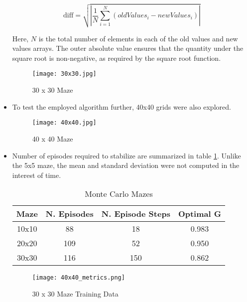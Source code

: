 \documentclass[letterpaper]{article} %
\begin{document}
\begin{itemize}
	    \begin{equation}
		\text{diff} = \sqrt{\left| \frac{1}{N} \sum_{i=1}^{N} (oldValues_i - newValues_i) \right| }
		\label{eq:value_fn_compare}
	    \end{equation}

	    Here, \( N \) is the total number of elements in each of the old values and new values arrays. The outer absolute value ensures that the quantity under the square root is non-negative, as required by the square root function.

	    \begin{figure}[htbp]
	      \centering
	      \texttt{[image: 30x30.jpg]}
		\caption{30 x 30 Maze}
	      \label{fig:30x30_solution}
	    \end{figure}

	    \item To test the employed algorithm further, 40x40 grids were also explored. 

	    \begin{figure}[htbp]
	      \centering
	      \texttt{[image: 40x40.jpg]}
		\caption{40 x 40 Maze}
	      \label{fig:40x40_solution}
	    \end{figure}



	\item Number of episodes required to stabilize are summarized in table \ref{tab:num_episodes}. Unlike the 5x5 maze, the mean and standard deviation were not computed in the interest of time.

	    \begin{table}[htbp]
	    \caption{Monte Carlo Mazes}
	    \label{tab:num_episodes}
	    \centering
	    \begin{tabular}{|c|c|c|c|}
	    \hline
		Maze    &  N. Episodes & N. Episode Steps & Optimal G       \\ \hline
		10x10   & 88        & 18                  & 0.983   \\ \hline
		20x20   & 109       & 52                  & 0.950   \\ \hline
		30x30   & 116       & 150                 & 0.862   \\ \hline
	    \end{tabular}
	    \end{table}

	    \begin{figure}[htbp]
	      \centering
	      \texttt{[image: 40x40\_metrics.png]}
		\caption{30 x 30 Maze Training Data}
	      \label{fig:metrics}
	    \end{figure}
	     
	\end{itemize}
\end{document}
